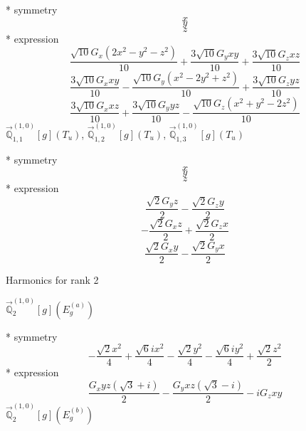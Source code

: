 \documentclass[fleqn,8pt]{jsarticle}
\begin{document}
\noindent\quad ** symmetry
\begin{dmath*}
x
\end{dmath*}
\begin{dmath*}
y
\end{dmath*}
\begin{dmath*}
z
\end{dmath*}
\noindent\quad ** expression
\begin{dmath*}
\frac{\sqrt{10} G_{x} \left(2 x^{2} - y^{2} - z^{2}\right)}{10} + \frac{3 \sqrt{10} G_{y} x y}{10} + \frac{3 \sqrt{10} G_{z} x z}{10}
\end{dmath*}
\begin{dmath*}
\frac{3 \sqrt{10} G_{x} x y}{10} - \frac{\sqrt{10} G_{y} \left(x^{2} - 2 y^{2} + z^{2}\right)}{10} + \frac{3 \sqrt{10} G_{z} y z}{10}
\end{dmath*}
\begin{dmath*}
\frac{3 \sqrt{10} G_{x} x z}{10} + \frac{3 \sqrt{10} G_{y} y z}{10} - \frac{\sqrt{10} G_{z} \left(x^{2} + y^{2} - 2 z^{2}\right)}{10}
\end{dmath*}
\noindent\quad $\vec{\mathbb{Q}}_{1,1}^{(1,0)}[g](T_{u})$, $\vec{\mathbb{Q}}_{1,2}^{(1,0)}[g](T_{u})$, $\vec{\mathbb{Q}}_{1,3}^{(1,0)}[g](T_{u})$

\noindent\quad ** symmetry
\begin{dmath*}
x
\end{dmath*}
\begin{dmath*}
y
\end{dmath*}
\begin{dmath*}
z
\end{dmath*}
\noindent\quad ** expression
\begin{dmath*}
\frac{\sqrt{2} G_{y} z}{2} - \frac{\sqrt{2} G_{z} y}{2}
\end{dmath*}
\begin{dmath*}
- \frac{\sqrt{2} G_{x} z}{2} + \frac{\sqrt{2} G_{z} x}{2}
\end{dmath*}
\begin{dmath*}
\frac{\sqrt{2} G_{x} y}{2} - \frac{\sqrt{2} G_{y} x}{2}
\end{dmath*}

\noindent * Harmonics for rank 2

\noindent\quad $\vec{\mathbb{Q}}_{2}^{(1,0)}[g](E_{g}^{(a)})$

\noindent\quad ** symmetry
\begin{dmath*}
- \frac{\sqrt{2} x^{2}}{4} + \frac{\sqrt{6} i x^{2}}{4} - \frac{\sqrt{2} y^{2}}{4} - \frac{\sqrt{6} i y^{2}}{4} + \frac{\sqrt{2} z^{2}}{2}
\end{dmath*}
\noindent\quad ** expression
\begin{dmath*}
\frac{G_{x} y z \left(\sqrt{3} + i\right)}{2} - \frac{G_{y} x z \left(\sqrt{3} - i\right)}{2} - i G_{z} x y
\end{dmath*}
\noindent\quad $\vec{\mathbb{Q}}_{2}^{(1,0)}[g](E_{g}^{(b)})$
\end{document}
